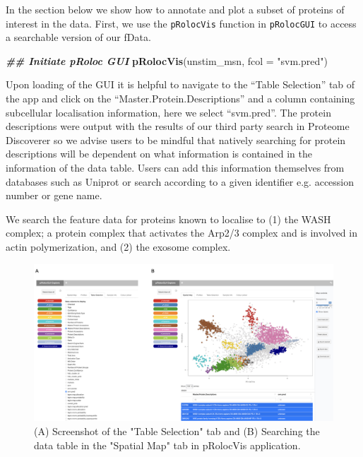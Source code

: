 \documentclass[9pt,a4paper,]{extarticle}
\newenvironment{Shaded}{\begin{snugshade}}{\end{snugshade}}
\newcommand{\AttributeTok}[1]{\textcolor[rgb]{0.13,0.29,0.53}{#1}}
\newcommand{\DocumentationTok}[1]{\textcolor[rgb]{0.56,0.35,0.01}{\textbf{\textit{#1}}}}
\newcommand{\FunctionTok}[1]{\textcolor[rgb]{0.13,0.29,0.53}{\textbf{#1}}}
\newcommand{\NormalTok}[1]{#1}
\newcommand{\StringTok}[1]{\textcolor[rgb]{0.31,0.60,0.02}{#1}}
\begin{document}
In the section below we show how to annotate and plot a subset of proteins of
interest in the data. First, we use the \texttt{pRolocVis} function in \texttt{pRolocGUI} to
access a searchable version of our fData.

\begin{Shaded}
\begin{Highlighting}[]
\DocumentationTok{\#\# Initiate pRoloc GUI}
\FunctionTok{pRolocVis}\NormalTok{(unstim\_msn, }\AttributeTok{fcol =} \StringTok{"svm.pred"}\NormalTok{)}
\end{Highlighting}
\end{Shaded}

Upon loading of the GUI it is helpful to navigate to the ``Table Selection'' tab
of the app and click on the ``Master.Protein.Descriptions'' and a column
containing subcellular localisation information, here we select ``svm.pred''. The
protein descriptions were output with the results of our third party search in
Proteome Discoverer so we advise users to be mindful that natively searching for
protein descriptions will be dependent on what information is contained in the
information of the data table. Users can add this information themselves from
databases such as Uniprot or search according to a given identifier e.g.
accession number or gene name.

We search the feature data for proteins known to localise to (1) the WASH complex;
a protein complex that activates the Arp2/3 complex and is involved in actin
polymerization, and (2) the exosome complex.

\begin{figure}[H]

{\centering \includegraphics[width=1\linewidth,]{figs/screenshot_complexes_gui} 

}

\caption{(A) Screenshot of the "Table Selection" tab and (B) Searching the data table in the "Spatial Map" tab in pRolocVis application.}\label{fig:pRolocvis-complex-gui}
\end{figure}
\end{document}
